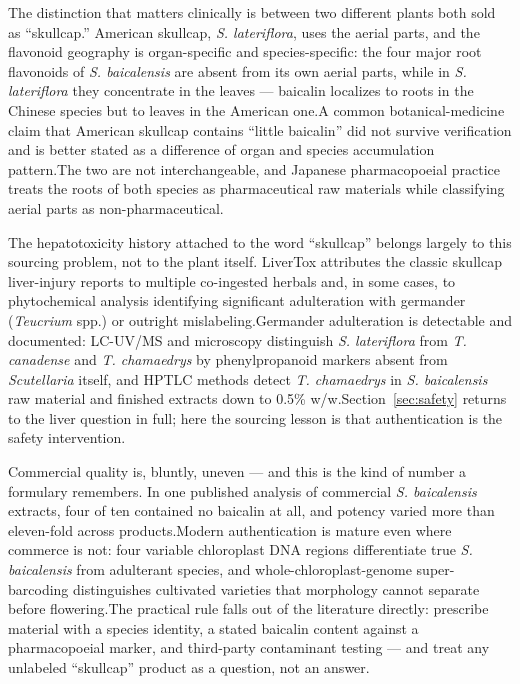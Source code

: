 \documentclass[11pt]{article}
\newcommand{\src}[1]{\allowbreak[#1]}
\begin{document}
The distinction that matters clinically is between two different plants both sold as ``skullcap.'' American skullcap, \textit{S. lateriflora}, uses the aerial parts, and the flavonoid geography is organ-specific and species-specific: the four major root flavonoids of \textit{S. baicalensis} are absent from its own aerial parts, while in \textit{S. lateriflora} they concentrate in the leaves --- baicalin localizes to roots in the Chinese species but to leaves in the American one.\src{94}\src{75} A common botanical-medicine claim that American skullcap contains ``little baicalin'' did not survive verification and is better stated as a difference of organ and species accumulation pattern.\src{94}\src{72} The two are not interchangeable, and Japanese pharmacopoeial practice treats the roots of both species as pharmaceutical raw materials while classifying aerial parts as non-pharmaceutical.\src{94}

The hepatotoxicity history attached to the word ``skullcap'' belongs largely to this sourcing problem, not to the plant itself. LiverTox attributes the classic skullcap liver-injury reports to multiple co-ingested herbals and, in some cases, to phytochemical analysis identifying significant adulteration with germander (\textit{Teucrium} spp.) or outright mislabeling.\src{64} Germander adulteration is detectable and documented: LC-UV/MS and microscopy distinguish \textit{S. lateriflora} from \textit{T. canadense} and \textit{T. chamaedrys} by phenylpropanoid markers absent from \textit{Scutellaria} itself, and HPTLC methods detect \textit{T. chamaedrys} in \textit{S. baicalensis} raw material and finished extracts down to 0.5\% w/w.\src{80}\src{82} Section~\ref{sec:safety} returns to the liver question in full; here the sourcing lesson is that authentication is the safety intervention.

Commercial quality is, bluntly, uneven --- and this is the kind of number a formulary remembers. In one published analysis of commercial \textit{S. baicalensis} extracts, four of ten contained no baicalin at all, and potency varied more than eleven-fold across products.\src{102} Modern authentication is mature even where commerce is not: four variable chloroplast DNA regions differentiate true \textit{S. baicalensis} from adulterant species, and whole-chloroplast-genome super-barcoding distinguishes cultivated varieties that morphology cannot separate before flowering.\src{89}\src{84} The practical rule falls out of the literature directly: prescribe material with a species identity, a stated baicalin content against a pharmacopoeial marker, and third-party contaminant testing --- and treat any unlabeled ``skullcap'' product as a question, not an answer.
\end{document}
